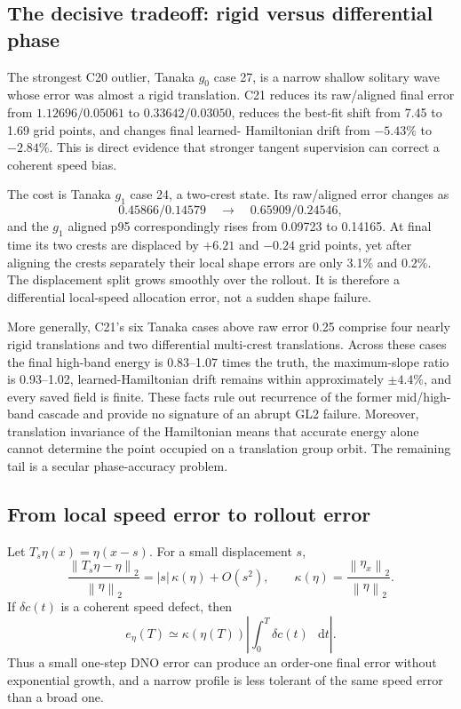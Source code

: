 \documentclass[11pt]{article}
\newcommand{\dd}{\mathop{}\!\mathrm{d}}
\newcommand{\norm}[1]{\left\lVert #1\right\rVert}
\begin{document}
\subsection{The decisive tradeoff: rigid versus differential phase}

The strongest C20 outlier, Tanaka \(g_0\) case 27, is a narrow shallow solitary
wave whose error was almost a rigid translation.  C21 reduces its raw/aligned
final error from \(1.12696/0.05061\) to \(0.33642/0.03050\), reduces the
best-fit shift from 7.45 to 1.69 grid points, and changes final learned-
Hamiltonian drift from \(-5.43\%\) to \(-2.84\%\).  This is direct evidence
that stronger tangent supervision can correct a coherent speed bias.

The cost is Tanaka \(g_1\) case 24, a two-crest state.  Its raw/aligned error
changes as
\[
 0.45866/0.14579\quad\longrightarrow\quad0.65909/0.24546,
\]
and the \(g_1\) aligned p95 correspondingly rises from 0.09723 to 0.14165.  At final time its
two crests are displaced by \(+6.21\) and \(-0.24\) grid points, yet after
aligning the crests separately their local shape errors are only 3.1\% and
0.2\%.  The displacement split grows smoothly over the rollout.  It is
therefore a differential local-speed allocation error, not a sudden shape
failure.

More generally, C21's six Tanaka cases above raw error 0.25 comprise four
nearly rigid translations and two differential multi-crest translations.
Across these cases the final high-band energy is 0.83--1.07 times the truth,
the maximum-slope ratio is 0.93--1.02, learned-Hamiltonian drift remains within
approximately \(\pm4.4\%\), and every saved field is finite.  These facts rule
out recurrence of the former mid/high-band cascade and provide no signature of
an abrupt GL2 failure.  Moreover, translation invariance of the Hamiltonian
means that accurate energy alone cannot determine the point occupied on a
translation group orbit.  The remaining tail is a secular phase-accuracy
problem.

\subsection{From local speed error to rollout error}

Let \(T_s\eta(x)=\eta(x-s)\).  For a small displacement \(s\),
\begin{equation}
 \frac{\norm{T_s\eta-\eta}_2}{\norm{\eta}_2}
 =|s|\,\kappa(\eta)+O(s^2),
 \qquad
 \kappa(\eta)=\frac{\norm{\eta_x}_2}{\norm{\eta}_2}.
 \label{eq:translation-sensitivity}
\end{equation}
If \(\delta c(t)\) is a coherent speed defect, then
\begin{equation}
 e_\eta(T)
 \simeq \kappa(\eta(T))
 \left|\int_0^T\delta c(t)\,\dd t\right|.
 \label{eq:secular-phase-growth}
\end{equation}
Thus a small one-step DNO error can produce an order-one final error without
exponential growth, and a narrow profile is less tolerant of the same speed
error than a broad one.
\end{document}
